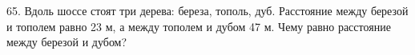65. Вдоль шоссе стоят три дерева: береза, тополь, дуб. Расстояние между березой и тополем равно 23 м, а между тополем и дубом 47 м. Чему равно расстояние между березой и дубом?\\
